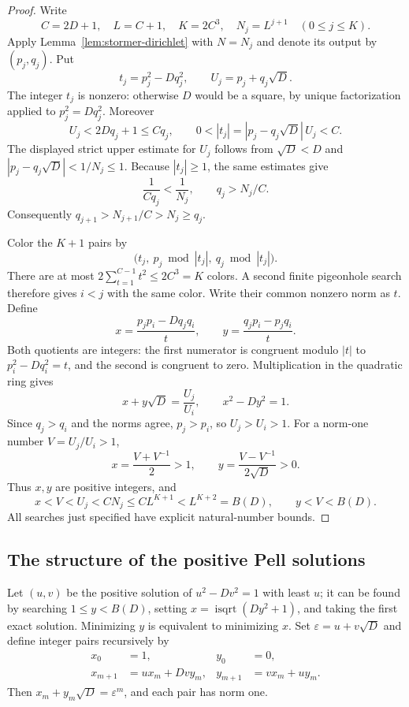 \begin{proof}
Write
\[
 C=2D+1,\quad L=C+1,\quad K=2C^3,\quad N_j=L^{j+1}
                    \quad(0\le j\le K).
\]
Apply Lemma~\ref{lem:stormer-dirichlet} with $N=N_j$ and denote its output by
$(p_j,q_j)$.  Put
\[
 t_j=p_j^2-Dq_j^2,\qquad U_j=p_j+q_j\sqrt D.
\]
The integer $t_j$ is nonzero: otherwise $D$ would be a square, by unique
factorization applied to $p_j^2=Dq_j^2$.  Moreover
\[
 U_j<2Dq_j+1\le Cq_j,
 \qquad
 0<|t_j|=|p_j-q_j\sqrt D|\,U_j<C.
\]
The displayed strict upper estimate for $U_j$ follows from $\sqrt D<D$ and
$|p_j-q_j\sqrt D|<1/N_j\le1$.
Because $|t_j|\ge1$, the same estimates give
\[
 \frac1{Cq_j}<\frac1{N_j},\qquad q_j>N_j/C.
\]
Consequently $q_{j+1}>N_{j+1}/C>N_j\ge q_j$.

Color the $K+1$ pairs by
\[
       \bigl(t_j,\ p_j\bmod |t_j|,\ q_j\bmod |t_j|\bigr).
\]
There are at most
$2\sum_{t=1}^{C-1}t^2\le2C^3=K$ colors.  A second finite pigeonhole search
therefore gives $i<j$ with the same color.  Write their common nonzero norm as
$t$.  Define
\[
 x=\frac{p_jp_i-Dq_jq_i}{t},\qquad
 y=\frac{q_jp_i-p_jq_i}{t}.
\]
Both quotients are integers: the first numerator is congruent modulo $|t|$ to
$p_i^2-Dq_i^2=t$, and the second is congruent to zero.  Multiplication in the
quadratic ring gives
\[
 x+y\sqrt D=\frac{U_j}{U_i},\qquad x^2-Dy^2=1.
\]
Since $q_j>q_i$ and the norms agree, $p_j>p_i$, so $U_j>U_i>1$.
For a norm-one number $V=U_j/U_i>1$,
\[
 x=\frac{V+V^{-1}}2>1,\qquad
 y=\frac{V-V^{-1}}{2\sqrt D}>0.
\]
Thus $x,y$ are positive integers, and
\[
 x<V<U_j<CN_j\le C L^{K+1}<L^{K+2}=B(D),
 \qquad y<V<B(D).
\]
All searches just specified have explicit natural-number bounds.
\end{proof}

\subsection{The structure of the positive Pell solutions}

Let $(u,v)$ be the positive solution of $u^2-Dv^2=1$ with least $u$; it can be
found by searching $1\le y<B(D)$, setting $x=\operatorname{isqrt}(Dy^2+1)$,
and taking the first exact solution.  Minimizing $y$ is equivalent to minimizing
$x$.  Set $\varepsilon=u+v\sqrt D$ and define integer pairs recursively by
\begin{align*}
 x_0&=1,&y_0&=0,\\
 x_{m+1}&=ux_m+Dvy_m,&y_{m+1}&=vx_m+uy_m.
\end{align*}
Then $x_m+y_m\sqrt D=\varepsilon^m$, and each pair has norm one.

